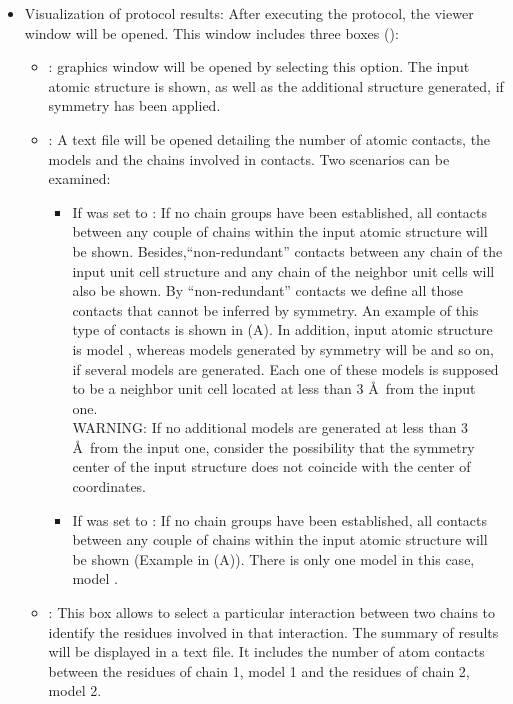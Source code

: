 \begin{itemize}
  \item Visualization of protocol results:
  After executing the protocol, the  viewer window will be opened. This window includes three boxes ():
        \begin{itemize}
        \item {}: \chimera graphics window will be opened by selecting this option. The input atomic structure is shown, as well as the additional structure generated, if symmetry has been applied.
        \item {}: A text file will be opened detailing the number of atomic contacts, the models and the chains involved in contacts. Two scenarios can be examined:
            \begin{itemize}
            \item If  was set to : If no chain groups have been established, all contacts between any couple of chains within the input atomic structure will be shown. Besides,``non-redundant'' contacts between any chain of the input unit cell structure and any chain of the neighbor unit cells will also be shown. By ``non-redundant'' contacts we define all those contacts that cannot be inferred by symmetry. An example of this type of contacts is shown in  (A). In addition, input atomic structure is model , whereas models generated by symmetry will be  and so on, if several models are generated. Each one of these models is supposed to be a neighbor unit cell located at less than 3 \AA\ from the input one.\\
            WARNING: If no additional models are generated at less than 3 \AA\ from the input one, consider the possibility that the symmetry center of the input structure does not coincide with the center of coordinates.
            \item If  was set to : If no chain groups have been established, all contacts between any couple of chains within the input atomic structure will be shown (Example in  (A)). There is only one model in this case, model .
            \end{itemize}
        \item {}: This box allows to select a particular interaction between two chains to identify the residues involved in that interaction. The summary of results will be displayed in a text file. It includes the number of atom contacts between the residues of chain 1, model 1 and the residues of chain 2, model 2.

\end{itemize}
\end{itemize}

